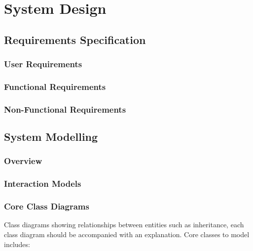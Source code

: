\chapter{System Design}


\section{Requirements Specification}

\subsection{User Requirements}

\subsection{Functional Requirements}

\subsection{Non-Functional Requirements}

\newpage


\section{System Modelling}

\subsection{Overview}

\subsection{Interaction Models}

\subsection{Core Class Diagrams}

\noindent
Class diagrams showing relationships between entities such as inheritance, each class diagram should be accompanied with an explanation. Core classes to model includes:

